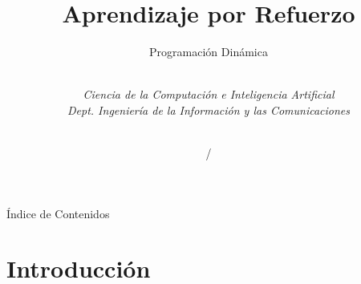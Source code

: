 \documentclass[10pt, envcountsect, handout, aspectratio=1610, hyperref={hypertexnames=true}]{beamer}
\title[Aprendizaje por Refuerzo]{Aprendizaje por Refuerzo}
\subtitle{Programación Dinámica} %
\author[L. D. Hernández] %
{%
	\sc{Luis Daniel Hernández Molinero }\\ %
	\textit{Ciencia de la Computación e Inteligencia Artificial}\\  %
	\textit{Dept. Ingeniería de la Información y las Comunicaciones}\\  %
	\\   %
}
\institute[DIIC]%
{
	\textit{Universidad de Murcia}
}
\date{\arabic{lastyear} / \the\year} %
\begin{document}
	











\begin{frame}[plain]
	\titlepage
\end{frame}


\begin{frame}{Índice de Contenidos}
	\tableofcontents 

\end{frame}





\section{Introducción}
\end{document}
